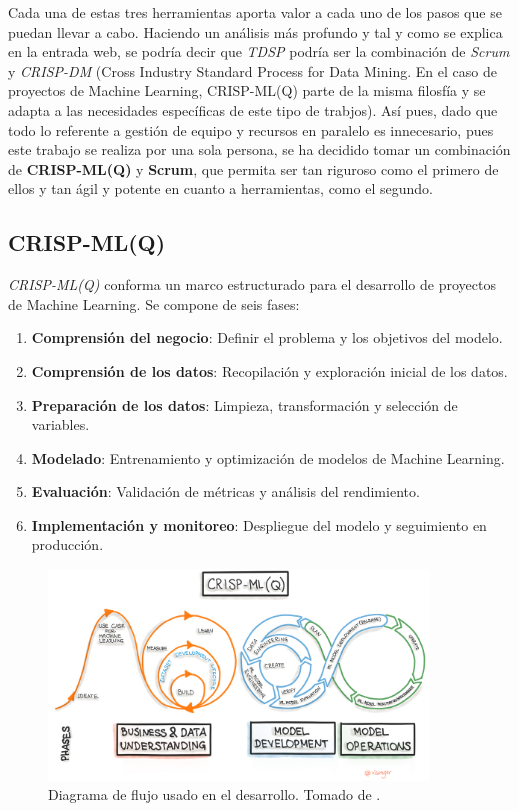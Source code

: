 Cada una de estas tres herramientas aporta valor a cada uno de los pasos que se puedan llevar a cabo. Haciendo un análisis más profundo y tal y como se explica en la entrada web\cite{TDSP-PM}, se podría decir que \emph{TDSP} podría ser la combinación de \emph{Scrum} y \emph{CRISP-DM} (Cross Industry Standard Process for Data Mining. En el caso de proyectos de Machine Learning, CRISP-ML(Q) parte de la misma filosfía y se adapta a las necesidades específicas de este tipo de trabjos). Así pues, dado que todo lo referente a gestión de equipo y recursos en paralelo es innecesario, pues este trabajo se realiza por una sola persona, se ha decidido tomar un combinación de \textbf{CRISP-ML(Q)} y \textbf{Scrum}, que permita ser tan riguroso como el primero de ellos y tan ágil y potente en cuanto a herramientas, como el segundo.

\subsection{CRISP-ML(Q)}

\emph{CRISP-ML(Q)} conforma un marco estructurado para el desarrollo de proyectos de Machine Learning. Se compone de seis fases:

\begin{enumerate}
    \item \textbf{Comprensión del negocio}: Definir el problema y los objetivos del modelo.
    \item \textbf{Comprensión de los datos}: Recopilación y exploración inicial de los datos.
    \item \textbf{Preparación de los datos}: Limpieza, transformación y selección de variables.
    \item \textbf{Modelado}: Entrenamiento y optimización de modelos de Machine Learning.
    \item \textbf{Evaluación}: Validación de métricas y análisis del rendimiento.
    \item \textbf{Implementación y monitoreo}: Despliegue del modelo y seguimiento en producción.
\end{enumerate}

\begin{figure}[H]
  \centering
  \includegraphics[width=0.9\textwidth]{images/crisp-ml-process.jpg}
  \caption{Diagrama de flujo usado en el desarrollo. Tomado de \cite{crispml}.}
  \label{fig:crispml-q-diagram}
\end{figure}

